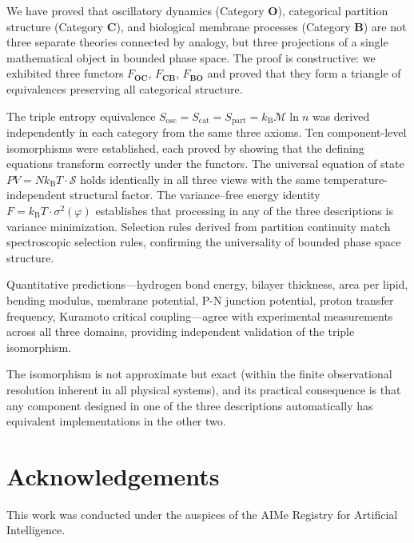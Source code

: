 \documentclass[twocolumn,10pt]{article}
\theoremstyle{remark}
\newcommand{\kB}{k_{\mathrm{B}}}
\newcommand{\Depth}{\mathcal{M}}
\newcommand{\CatO}{\mathbf{O}}
\newcommand{\CatC}{\mathbf{C}}
\newcommand{\CatB}{\mathbf{B}}
\newcommand{\Foc}{F_{\CatO\CatC}}
\newcommand{\Fcb}{F_{\CatC\CatB}}
\newcommand{\Fbo}{F_{\CatB\CatO}}
\begin{document}
We have proved that oscillatory dynamics (Category $\CatO$), categorical partition structure (Category $\CatC$), and biological membrane processes (Category $\CatB$) are not three separate theories connected by analogy, but three projections of a single mathematical object in bounded phase space.
The proof is constructive: we exhibited three functors $\Foc$, $\Fcb$, $\Fbo$ and proved that they form a triangle of equivalences preserving all categorical structure.

The triple entropy equivalence $S_{\mathrm{osc}} = S_{\mathrm{cat}} = S_{\mathrm{part}} = \kB\Depth\ln n$ was derived independently in each category from the same three axioms.
Ten component-level isomorphisms were established, each proved by showing that the defining equations transform correctly under the functors.
The universal equation of state $PV = N\kB T \cdot \mathcal{S}$ holds identically in all three views with the same temperature-independent structural factor.
The variance--free energy identity $F = \kB T \cdot \sigma^2(\varphi)$ establishes that processing in any of the three descriptions is variance minimization.
Selection rules derived from partition continuity match spectroscopic selection rules, confirming the universality of bounded phase space structure.

Quantitative predictions---hydrogen bond energy, bilayer thickness, area per lipid, bending modulus, membrane potential, P-N junction potential, proton transfer frequency, Kuramoto critical coupling---agree with experimental measurements across all three domains, providing independent validation of the triple isomorphism.

The isomorphism is not approximate but exact (within the finite observational resolution inherent in all physical systems), and its practical consequence is that any component designed in one of the three descriptions automatically has equivalent implementations in the other two.

\section*{Acknowledgements}
This work was conducted under the auspices of the AIMe Registry for Artificial Intelligence.



\end{document}

